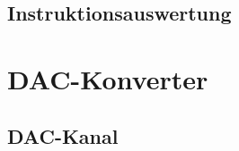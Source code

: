 \subsection{Instruktionsauswertung}

\section{DAC-Konverter} \label{Comp:DAC}
\subsection{DAC-Kanal}

